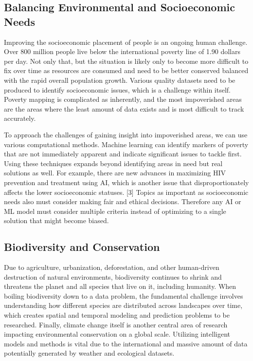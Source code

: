 \documentclass[journal,onecolumn]{IEEEtran}
\begin{document}
\subsection{Balancing Environmental and Socioeconomic Needs}

Improving the socioeconomic placement of people is an ongoing human challenge. Over 800 million people live below the international poverty line of 1.90 dollars per day. 
Not only that, but the situation is likely only to become more difficult to fix over time as resources are consumed and need to be better conserved balanced with the rapid overall population growth. 
Various quality datasets need to be produced to identify socioeconomic issues, which is a challenge within itself. Poverty mapping is complicated as inherently, and the most impoverished areas are the areas where the least amount of data exists and is most difficult to track accurately. 

To approach the challenges of gaining insight into impoverished areas, we can use various computational methods. 
Machine learning can identify markers of poverty that are not immediately apparent and indicate significant issues to tackle first. 
Using these techniques expands beyond identifying areas in need but real solutions as well. 
For example, there are new advances in maximizing HIV prevention and treatment using AI, which is another issue that disproportionately affects the lower socioeconomic statuses. [3]
Topics as important as socioeconomic needs also must consider making fair and ethical decisions. Therefore any AI or ML model must consider multiple criteria instead of optimizing to a single solution that might become biased. 

\subsection{Biodiversity and Conservation}

Due to agriculture, urbanization, deforestation, and other human-driven destruction of natural environments, biodiversity continues to shrink and threatens the planet and all species that live on it, including humanity.
When boiling biodiversity down to a data problem, the fundamental challenge involves understanding how different species are distributed across landscapes over time, which creates spatial and temporal modeling and prediction problems to be researched.
Finally, climate change itself is another central area of research impacting environmental conservation on a global scale. Utilizing intelligent models and methods is vital due to the international and massive amount of data potentially generated by weather and ecological datasets. 
\end{document}
